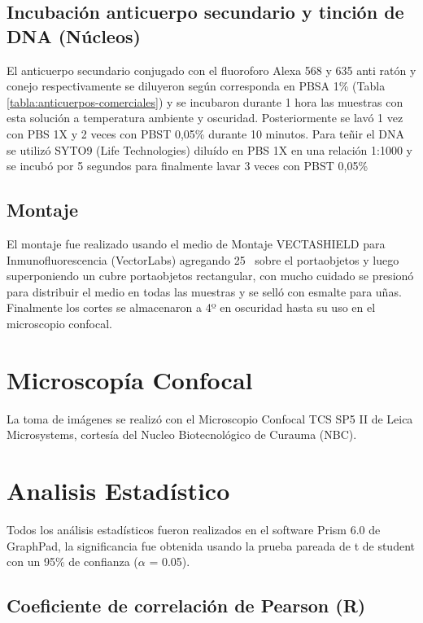 \documentclass[12pt,letterpaper,oneside]{scrbook}
\begin{document}
\subsection{Incubación anticuerpo secundario y tinción de DNA (Núcleos)}

El anticuerpo secundario conjugado con el fluoroforo Alexa 568 y 635
anti ratón y conejo respectivamente se diluyeron según corresponda en
PBSA 1\% (Tabla \ref{tabla:anticuerpos-comerciales}) y se incubaron
durante 1 hora las muestras con esta solución a temperatura ambiente y
oscuridad. Posteriormente se lavó 1 vez con PBS 1X y 2 veces con PBST
0,05\% durante 10 minutos. Para teñir el DNA se utilizó SYTO9 (Life
Technologies) diluído en PBS 1X en una relación 1:1000 y se incubó por 5
segundos para finalmente lavar 3 veces con PBST 0,05\%

\subsection{Montaje}

El montaje fue realizado usando el medio de Montaje VECTASHIELD para
Inmunofluorescencia (VectorLabs) agregando 25\si{\micro\litro} sobre el
portaobjetos y luego superponiendo un cubre portaobjetos rectangular,
con mucho cuidado se presionó para distribuir el medio en todas las
muestras y se selló con esmalte para uñas. Finalmente los cortes se
almacenaron a 4º en oscuridad hasta su uso en el microscopio confocal.

\section{Microscopía Confocal}

La toma de imágenes se realizó con el Microscopio Confocal TCS SP5 II de
Leica Microsystems, cortesía del Nucleo Biotecnológico de Curauma (NBC).

\section{Analisis Estadístico}

Todos los análisis estadísticos fueron realizados en el software Prism
6.0 de GraphPad, la significancia fue obtenida usando la prueba pareada
de t de student con un 95\% de confianza (\(\alpha\) = 0.05).

\subsection{Coeficiente de correlación de Pearson (R)}
\end{document}
